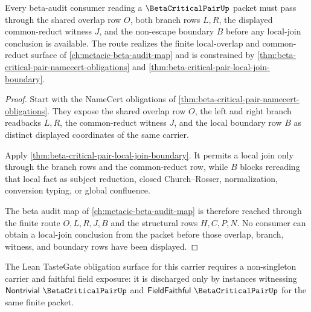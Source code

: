\begin{theorem}
\label{thm:beta-critical-pair-local-join-route}
Every beta-audit consumer reading a $\BetaCriticalPairUp$ packet must pass through the shared overlap row $O$, both branch rows $L,R$, the displayed common-reduct witness $J$, and the non-escape boundary $B$ before any local-join conclusion is available. The route realizes the finite local-overlap and common-reduct surface of \autoref{ch:metacic-beta-audit-map} and is constrained by \autoref{thm:beta-critical-pair-namecert-obligations} and \autoref{thm:beta-critical-pair-local-join-boundary}.
\end{theorem}
\begin{proof}
Start with the NameCert obligations of \autoref{thm:beta-critical-pair-namecert-obligations}. They expose the shared overlap row $O$, the left and right branch readbacks $L,R$, the common-reduct witness $J$, and the local boundary row $B$ as distinct displayed coordinates of the same carrier.

Apply \autoref{thm:beta-critical-pair-local-join-boundary}. It permits a local join only through the branch rows and the common-reduct row, while $B$ blocks rereading that local fact as subject reduction, closed Church--Rosser, normalization, conversion typing, or global confluence.

The beta audit map of \autoref{ch:metacic-beta-audit-map} is therefore reached through the finite route $O,L,R,J,B$ and the structural rows $H,C,P,N$. No consumer can obtain a local-join conclusion from the packet before those overlap, branch, witness, and boundary rows have been displayed.
\end{proof}



The Lean TasteGate obligation surface for this carrier requires a non-singleton carrier and faithful field exposure: it is discharged only by instances witnessing $\mathsf{Nontrivial}\ \BetaCriticalPairUp$ and $\mathsf{FieldFaithful}\ \BetaCriticalPairUp$ for the same finite packet.

